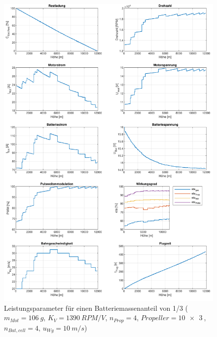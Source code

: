 \begin{appendix}
\begin{figure}[H]
\centering
	\includegraphics[scale=0.7]{Diagramme/Einfluss_eta_ges.pdf}
	\caption{Leistungsparameter für einen Batteriemassenanteil von 1/3 (\ensuremath{m_{Mot}=\SI{106}{g}}, \ensuremath{K_V=\SI{1390}{RPM/V}}, \ensuremath{n_{Prop}=4}, \ensuremath{Propeller=\SI{10x3}{}}, \ensuremath{n_{Bat,cell}=4}, \ensuremath{u_{Wg}=\SI{10}{m/s}})}
	\label{abb:m_bat_eta_ges1/3}
\end{figure}


\end{appendix}
